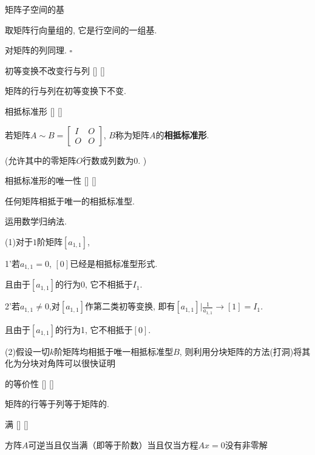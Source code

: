 \documentclass[UTF8]{ctexart}
\begin{document}
		\begin{prf}
			{}
			{矩阵子空间的基}
			{}
			{}

			取矩阵行向量组的, 它是行空间的一组基. 
			
			对矩阵的列同理. $\square$
		\end{prf}
  
		\begin{ppt}
			[]
			{初等变换不改变行\秩 与列\秩}
			[]
			[]

			矩阵的行\秩 与列\秩 在初等变换下不变. 
		\end{ppt}
		
		\begin{dfn}
			[]
			{相抵标准形}
			[]
			[]

			若矩阵$A\sim B=
			\begin{bmatrix}
			I & O \\
			O & O 
			\end{bmatrix}$, $B$称为矩阵$A$的\textbf{相抵标准形}. 
			
			(允许其中的零矩阵$O$行数或列数为$0$. )
		\end{dfn}
		
		\begin{ppt}
			[]
			{相抵标准形的唯一性}
			[]
			[]

			任何矩阵相抵于唯一的相抵标准型. 
		\end{ppt}
  
		\begin{prf}
			运用数学归纳法. 
			
			(1)对于$1$阶矩阵$[a_{1,1}]$, 
			
			1'若$a_{1,1}=0$, $[0]$已经是相抵标准型形式. 
			
			且由于$[a_{1,1}]$的行\秩 为0, 它不相抵于$I_1$. 
			
			2'若$a_{1,1}\neq 0$,对$[a_{1,1}]$作第二类初等变换, 即有$[a_{1,1}]|\frac{1}{a_{1,1}}\longrightarrow[1]=I_1. $
			
			且由于$[a_{1,1}]$的行\秩 为1, 它不相抵于$[0]$. 
			
			(2)假设一切$k$阶矩阵均相抵于唯一相抵标准型$B$, 则利用分块矩阵的方法(打洞)将其化为分块对角阵可以很快证明
		\end{prf}
  
		\begin{thm}
			[]
			{\秩 的等价性}
			[]
			[]

			矩阵的行\秩 等于列\秩 等于矩阵的\秩. 
		\end{thm}
  
        \begin{thm}
			[]
			{满\秩}
			[]
			[]

            方阵$A$可逆当且仅当满\秩（即\秩 等于阶数）当且仅当方程$Ax=0$没有非零解
        \end{thm}
        
\end{document}
